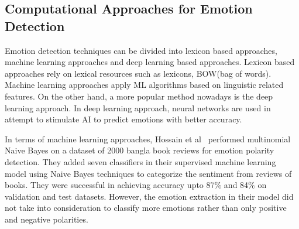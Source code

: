 \documentclass[runningheads]{llncs}
\begin{document}
\begin{table}
\caption{Available datasets for detecting emotion from texts}\label{tab1}
\end{table}

\subsection{Computational Approaches for Emotion Detection}
Emotion detection techniques can be divided into lexicon based approaches, machine learning approaches and deep learning based approaches. Lexicon based approaches rely on lexical resources such as lexicons, BOW(bag of words). Machine learning approaches apply ML algorithms based on linguistic related features. On the other hand, a more popular method nowadays is the deep learning approach. In deep learning approach, neural networks are used in attempt to stimulate AI to predict emotions with better accuracy.

In terms of machine learning approaches, Hossain et al~\cite{ref4} performed multinomial Naive Bayes on a dataset of 2000 bangla book reviews for emotion polarity detection. They added seven classifiers in their supervised machine learning model using Naive Bayes techniques to categorize the sentiment from reviews of books. They were successful in achieving accuracy upto 87\% and 84\% on validation and test datasets. However, the emotion extraction in their model did not take into consideration to classify more emotions rather than only positive and negative polarities. 
\end{document}

